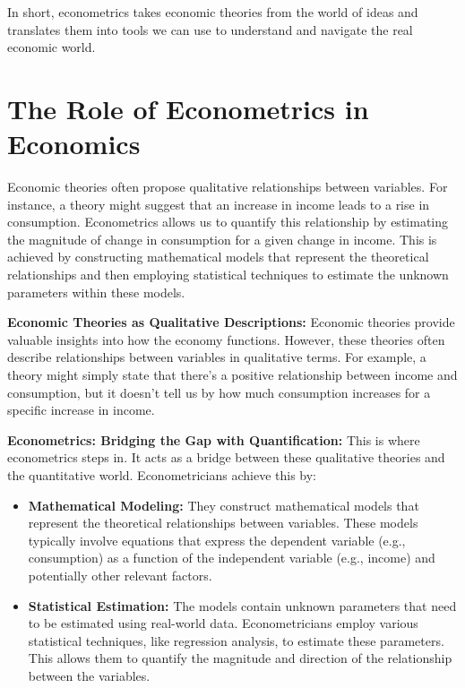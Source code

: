 \documentclass[
  letterpaper,
  paper =a4,
  twoside,
  openright,
  headsepline,
  footsepline,
  listof = totocnumbered,
  chapterprefix = true,
  firstiscover,
  parskip = full*]{scrbook}
\begin{document}
In short, econometrics takes economic theories from the world of ideas
and translates them into tools we can use to understand and navigate the
real economic world.

\section{The Role of Econometrics in
Economics}\label{the-role-of-econometrics-in-economics}

Economic theories often propose qualitative relationships between
variables. For instance, a theory might suggest that an increase in
income leads to a rise in consumption. Econometrics allows us to
quantify this relationship by estimating the magnitude of change in
consumption for a given change in income. This is achieved by
constructing mathematical models that represent the theoretical
relationships and then employing statistical techniques to estimate the
unknown parameters within these models.

\textbf{Economic Theories as Qualitative Descriptions:} Economic
theories provide valuable insights into how the economy functions.
However, these theories often describe relationships between variables
in qualitative terms. For example, a theory might simply state that
there's a positive relationship between income and consumption, but it
doesn't tell us by how much consumption increases for a specific
increase in income.

\textbf{Econometrics: Bridging the Gap with Quantification:} This is
where econometrics steps in. It acts as a bridge between these
qualitative theories and the quantitative world. Econometricians achieve
this by:

\begin{itemize}
\item
  \textbf{Mathematical Modeling:} They construct mathematical models
  that represent the theoretical relationships between variables. These
  models typically involve equations that express the dependent variable
  (e.g., consumption) as a function of the independent variable (e.g.,
  income) and potentially other relevant factors.
\item
  \textbf{Statistical Estimation:} The models contain unknown parameters
  that need to be estimated using real-world data. Econometricians
  employ various statistical techniques, like regression analysis, to
  estimate these parameters. This allows them to quantify the magnitude
  and direction of the relationship between the variables.
\end{itemize}
\end{document}
